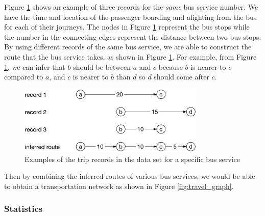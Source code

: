 \documentclass[conference]{IEEEtran.1.8}
\begin{document}
Figure \ref{fig:trip_example} shows an example of three records for the \emph{same} bus service number. We have the time and location of the passenger boarding and alighting from the bus for each of their journeys. The nodes in Figure \ref{fig:trip_example} represent the bus stops while the number in the connecting edges represent the distance between two bus stops. By using different records of the same bus service, we are able to construct the route that the bus service takes, as shown in Figure \ref{fig:trip_example}. For example, from Figure \ref{fig:trip_example}, we can infer that $b$ should be between $a$ and $c$ because $b$ is nearer to $c$ compared to $a$, and $c$ is nearer to $b$ than $d$ so $d$ should come after $c$.
\begin{figure}[htb]
	\centering
	\includegraphics[width=3.5in]{trip_example}
	\caption{Examples of the trip records in the data set for a specific bus service}
	\label{fig:trip_example}
\end{figure}
Then by combining the inferred routes of various bus services, we would be able to obtain a transportation network as shown in Figure \ref{fig:travel_graph}.

\subsubsection{Statistics}
\end{document}
